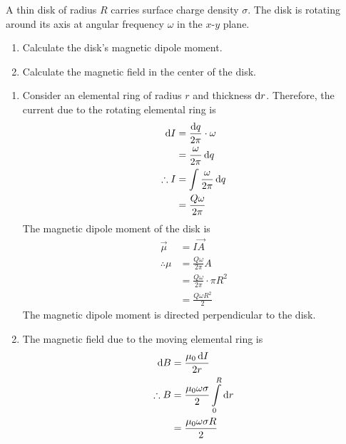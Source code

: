 \documentclass[fleqn, a4paper, 12pt, twoside]{article}
\theoremstyle{definition}
\theoremstyle{theorem}
\begin{document}
\addtocounter{question}{1}

\begin{question}
	A thin disk of radius $R$ carries surface charge density $\sigma$.
	The disk is rotating around its axis at angular frequency $\omega$ in the $x$-$y$ plane.
	\begin{enumerate}
		\item Calculate the disk's magnetic dipole moment.
		\item Calculate the magnetic field in the center of the disk.
	\end{enumerate}
\end{question}

\begin{solution}
	\begin{enumerate}[leftmargin = *]
		\item
			Consider an elemental ring of radius $r$ and thickness $\dif r$.
			Therefore, the current due to the rotating elemental ring is
			\begin{align*}
				\dif I       & = \frac{\dif q}{2 \pi} \cdot \omega \\
                                             & = \frac{\omega}{2 \pi} \dif q       \\
				\therefore I & = \int \frac{\omega}{2 \pi} \dif q  \\
                                             & = \frac{Q \omega}{2 \pi}
			\end{align*}
			The magnetic dipole moment of the disk is
			\begin{align*}
				\overrightarrow{\mu} & = I \overrightarrow{A}                 \\
				\therefore \mu       & = \frac{Q \omega}{2 \pi} A             \\
                                                     & = \frac{Q \omega}{2 \pi} \cdot \pi R^2 \\
                                                     & = \frac{Q \omega R^2}{2}
			\end{align*}
			The magnetic dipole moment is directed perpendicular to the disk.
		\item
			The magnetic field due to the moving elemental ring is
			\begin{align*}
				\dif B       & = \frac{\mu_0 \dif I}{2 r}                                 \\
				\therefore B & = \frac{\mu_0 \omega \sigma}{2} \int\limits_{0}^{R} \dif r \\
                                             & = \frac{\mu_0 \omega \sigma R}{2}
			\end{align*}
	\end{enumerate}
\end{solution}
\end{document}
